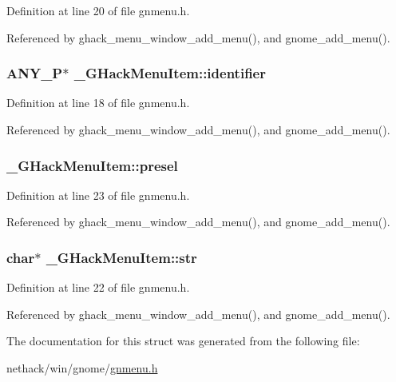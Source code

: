 Definition at line 20 of file gnmenu.\+h.



Referenced by ghack\+\_\+menu\+\_\+window\+\_\+add\+\_\+menu(), and gnome\+\_\+add\+\_\+menu().

\hypertarget{struct__GHackMenuItem_a79a3cfa67a108ba6055d4fa6bd081f79}{
\subsubsection[{identifier}]{ {\bf A\+N\+Y\+\_\+\+P}$\ast$ \+\_\+\+G\+Hack\+Menu\+Item\+::identifier}}\label{struct__GHackMenuItem_a79a3cfa67a108ba6055d4fa6bd081f79}


Definition at line 18 of file gnmenu.\+h.



Referenced by ghack\+\_\+menu\+\_\+window\+\_\+add\+\_\+menu(), and gnome\+\_\+add\+\_\+menu().

\hypertarget{struct__GHackMenuItem_a0b6f9304a066862ccf1cf77632e4936c}{
\subsubsection[{presel}]{ \+\_\+\+G\+Hack\+Menu\+Item\+::presel}}\label{struct__GHackMenuItem_a0b6f9304a066862ccf1cf77632e4936c}


Definition at line 23 of file gnmenu.\+h.



Referenced by ghack\+\_\+menu\+\_\+window\+\_\+add\+\_\+menu(), and gnome\+\_\+add\+\_\+menu().

\hypertarget{struct__GHackMenuItem_a338f49c097ab2101d16b3acb300ebf41}{
\subsubsection[{str}]{ char$\ast$ \+\_\+\+G\+Hack\+Menu\+Item\+::str}}\label{struct__GHackMenuItem_a338f49c097ab2101d16b3acb300ebf41}


Definition at line 22 of file gnmenu.\+h.



Referenced by ghack\+\_\+menu\+\_\+window\+\_\+add\+\_\+menu(), and gnome\+\_\+add\+\_\+menu().



The documentation for this struct was generated from the following file\+:\begin{DoxyCompactItemize}
\item 
nethack/win/gnome/\hyperlink{gnmenu_8h}{gnmenu.\+h}\end{DoxyCompactItemize}
